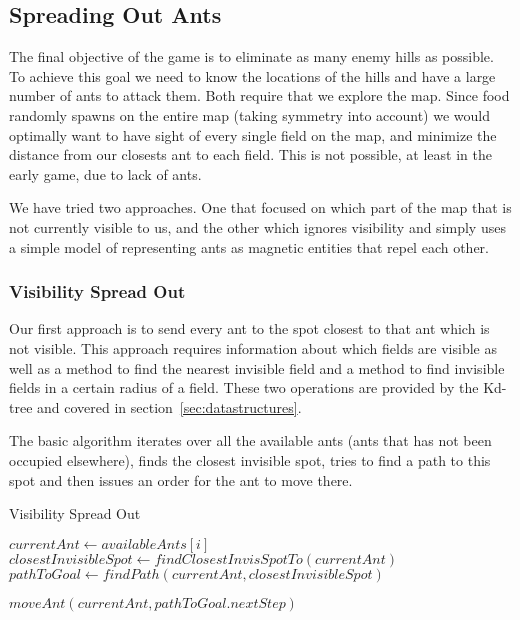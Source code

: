 \subsection{Spreading Out Ants}
The final objective of the game is to eliminate as many enemy hills as possible. To achieve this goal we need to know the locations of the hills and have a large number of ants to attack them. Both require that we explore the map. Since food randomly spawns on the entire map (taking symmetry into account) we would optimally want to have sight of every single field on the map, and minimize the distance from our closests ant to each field. This is not possible, at least in the early game, due to lack of ants.

We have tried two approaches. One that focused on which part of the map that is not currently visible to us, and the other which ignores visibility and simply uses a simple model of representing ants as magnetic entities that repel each other.

\subsubsection{Visibility Spread Out}
Our first approach is to send every ant to the spot closest to that ant which is not visible. This approach requires information about which fields are visible as well as a method to find the nearest invisible field and a method to find invisible fields in a certain radius of a field. These two operations are provided by the Kd-tree and covered in section~\ref{sec:datastructures}.

The basic algorithm iterates over all the available ants (ants that has not been occupied elsewhere), finds the closest invisible spot, tries to find a path to this spot and then issues an order for the ant to move there.


\begin{algorithm}
\caption{Visibility Spread Out}
\label{alg:visibilityspreadout}
\begin{algorithmic}
\STATE $currentAnt \gets availableAnts[i]$
\STATE $closestInvisibleSpot \gets findClosestInvisSpotTo(currentAnt)$
\STATE $pathToGoal \gets findPath(currentAnt, closestInvisibleSpot)$


\STATE $moveAnt(currentAnt, pathToGoal.nextStep)$
\ENDIF
\ENDFOR
\end{algorithmic}
\end{algorithm}

